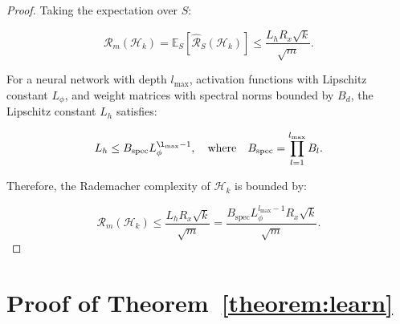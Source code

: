 \begin{proof}
Taking the expectation over \( S \):

\[
\mathcal{R}_m(\mathcal{H}_k) = \mathbb{E}_S \left[ \hat{\mathcal{R}}_S(\mathcal{H}_k) \right] \leq \frac{L_h R_x \sqrt{k}}{\sqrt{m}}.
\]


For a neural network with depth \( l_{\text{max}} \), activation functions with Lipschitz constant \( L_{\phi} \), and weight matrices with spectral norms bounded by \( B_d \), the Lipschitz constant \( L_h \) satisfies:

\[
L_h \leq B_{\text{spec}} L_{\phi}^{\l_{\text{max}}-1}, \quad \text{where} \quad B_{\text{spec}} = \prod_{l=1}^{l_{\text{max}}} B_l.
\]

Therefore, the Rademacher complexity of \( \mathcal{H}_k \) is bounded by:

\[
\mathcal{R}_m(\mathcal{H}_k) \leq \frac{L_h R_x \sqrt{k}}{\sqrt{m}} = \frac{B_{\text{spec}} L_{\phi}^{l_{\text{max}}-1} R_x \sqrt{k}}{\sqrt{m}}.
\]
\end{proof}
\section{Proof of Theorem~\ref{theorem:learn}}\label{appendix:theorem5.6}

